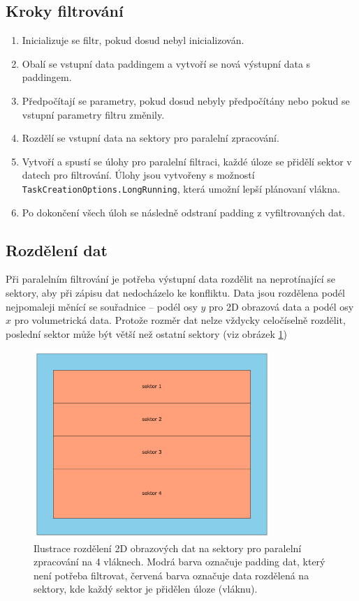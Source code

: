 \subsection*{Kroky filtrování}
\begin{enumerate}
    \item Inicializuje se filtr, pokud dosud nebyl inicializován.
    \item Obalí se vstupní data paddingem a vytvoří se nová výstupní data s paddingem.
    \item Předpočítají se parametry, pokud dosud nebyly předpočítány nebo pokud se vstupní parametry filtru změnily.
    \item Rozdělí se vstupní data na sektory pro paralelní zpracování.
    \item Vytvoří a spustí se úlohy pro paralelní filtraci, každé úloze se přidělí sektor v datech pro filtrování. Úlohy jsou vytvořeny s možností \texttt{TaskCreationOptions.LongRunning}, která umožní lepší plánovaní vlákna.
    \item Po dokončení všech úloh se následně odstraní padding z vyfiltrovaných dat.
\end{enumerate}

\subsection*{Rozdělení dat}
Při paralelním filtrování je potřeba výstupní data rozdělit na neprotínající se sektory, aby při zápisu dat nedocházelo ke konfliktu. Data jsou rozdělena podél nejpomaleji měnící se souřadnice -- podél osy $y$ pro 2D obrazová data a podél osy $x$ pro volumetrická data. Protože rozměr dat nelze vždycky celočíselně rozdělit, poslední sektor může být větší než ostatní sektory (viz obrázek \ref{fig:impl:split})

\begin{figure} [H]
    \centering
    \label{fig:impl:split}
    \includegraphics[width=0.80\textwidth]{figures/split.pdf}
    \caption{Ilustrace rozdělení 2D obrazových dat na sektory pro paralelní zpracování na 4 vláknech. Modrá barva označuje padding dat, který není potřeba filtrovat, červená barva označuje data rozdělená na sektory, kde každý sektor je přidělen úloze (vláknu).}
\end{figure}

